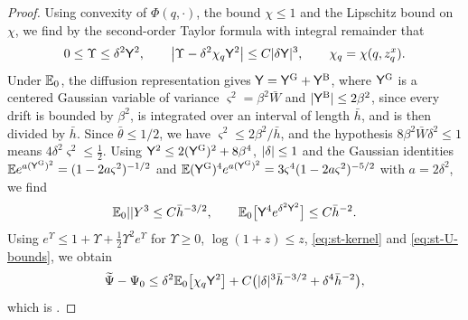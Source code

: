 \begin{proof}
Using convexity of $\Phi(q,\cdot)$, the bound $\chi\le1$ and the Lipschitz bound on $\chi$, we find by the second-order Taylor formula with integral remainder that
\begin{equation}\label{eq:st-U-bounds}
 0\le\Upsilon\le\delta^2\mathsf Y^2,\qquad\bigl|\Upsilon-\delta^2\chi_q\mathsf Y^2\bigr|\le C\lvert \delta\mathsf Y\rvert^3,\qquad\chi_q=\chi(q,z^x_q).
\end{equation}
Under $\mathbb E_0$, the diffusion representation gives $\mathsf Y=\mathsf Y^{\rm G}+\mathsf Y^{\rm B}$, where $\mathsf Y^{\rm G}$ is a centered Gaussian variable of variance $\varsigma^2=\beta^2\bar W$ and $\lvert \mathsf Y^{\rm B}\rvert\le2\beta^2$, since every drift is bounded by $\beta^2$, is integrated over an interval of length $\bar h$, and is then divided by $\bar h$. Since $\bar\theta\le1/2$, we have $\varsigma^2\le2\beta^2/\bar h$, and the hypothesis $8\beta^2\bar W\delta^2\le1$ means $4\delta^2\varsigma^2\le\frac12$. Using $\mathsf Y^2\le2(\mathsf Y^{\rm G})^2+8\beta^4$, $\lvert \delta\rvert\le1$ and the Gaussian identities $\mathbb E e^{a(\mathsf Y^{\rm G})^2}=(1-2a\varsigma^2)^{-1/2}$ and $\mathbb E(\mathsf Y^{\rm G})^4e^{a(\mathsf Y^{\rm G})^2}=3\varsigma^4(1-2a\varsigma^2)^{-5/2}$ with $a=2\delta^2$, we find
\[
 \mathbb E_0\lvert \mathsf\rvert Y^3\le C\bar h^{-3/2},\qquad\mathbb E_0\bigl[\mathsf Y^4e^{\delta^2\mathsf Y^2}\bigr]\le C\bar h^{-2}.
\]
Using $e^\Upsilon\le1+\Upsilon+\frac12\Upsilon^2e^\Upsilon$ for $\Upsilon\ge0$, $\log(1+z)\le z$, \eqref{eq:st-kernel} and \eqref{eq:st-U-bounds}, we obtain
\begin{equation}\label{eq:st-exponential-error}
 \widetilde\Psi-\Psi_0\le\delta^2\mathbb E_0\bigl[\chi_q\mathsf Y^2\bigr]+C\bigl(\lvert \delta\rvert^3\bar h^{-3/2}+\delta^4\bar h^{-2}\bigr),
\end{equation}
which is \cite[(7.19)]{oai-barriers}.


\end{proof}
